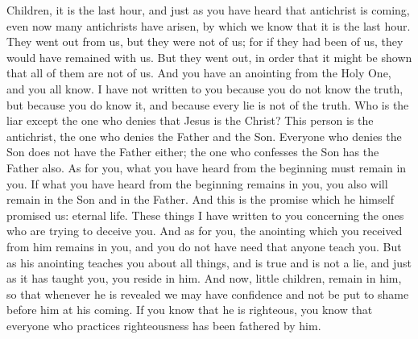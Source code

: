 \begin{biblechapter}
 Children, it is the last hour, and just as you have heard that antichrist is coming, even now many antichrists have arisen, by which we know that it is the last hour.
\verse They went out from us, but they were not of us; for if they had been of us, they would have remained with us. But they went out, in order that it might be shown that all of them are not of us.
\verse And you have an anointing from the Holy One, and you all know.
\verse I have not written to you because you do not know the truth, but because you do know it, and because every lie is not of the truth.
\verse Who is the liar except the one who denies that Jesus is the Christ? This person is the antichrist, the one who denies the Father and the Son.
\verse Everyone who denies the Son does not have the Father either; the one who confesses the Son has the Father also.
\verse As for you, what you have heard from the beginning must remain in you. If what you have heard from the beginning remains in you, you also will remain in the Son and in the Father.
\verse And this is the promise which he himself promised us: eternal life.
\verse These things I have written to you concerning the ones who are trying to deceive you.
\verse And as for you, the anointing which you received from him remains in you, and you do not have need that anyone teach you. But as his anointing teaches you about all things, and is true and is not a lie, and just as it has taught you, you reside in him.
 And now, little children, remain in him, so that whenever he is revealed we may have confidence and not be put to shame before him at his coming.
\verse If you know that he is righteous, you know that everyone who practices righteousness has been fathered by him.
\end{biblechapter}

